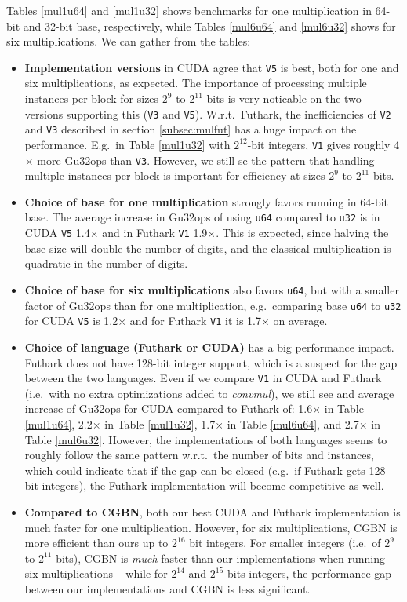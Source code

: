 Tables \ref{mul1u64} and \ref{mul1u32} shows benchmarks for one multiplication
in 64-bit and 32-bit base, respectively, while Tables \ref{mul6u64} and
\ref{mul6u32} shows for six multiplications. We can gather from the tables:
\begin{itemize}
  \renewcommand\labelitemi{--}
\item \textbf{Implementation versions} in CUDA agree that \texttt{V5} is best,
  both for one and six multiplications, as expected. The importance of
  processing multiple instances per block for sizes $2^9$ to $2^{11}$ bits is
  very noticable on the two versions supporting this (\texttt{V3} and
  \texttt{V5}). W.r.t.\ Futhark, the inefficiencies of \texttt{V2} and
  \texttt{V3} described in section \ref{subsec:mulfut} has a huge impact on the
  performance. E.g.\ in Table \ref{mul1u32} with $2^{12}$-bit integers,
  \texttt{V1} gives roughly 4$\times$ more Gu32ops than \texttt{V3}. However, we
  still se the pattern that handling multiple instances per block is important
  for efficiency at sizes $2^9$ to $2^{11}$ bits.
\item \textbf{Choice of base for one multiplication} strongly favors running in
  64-bit base. The average increase in Gu32ops of using \texttt{u64} compared to
  \texttt{u32} is in CUDA \texttt{V5} 1.4$\times$ and in Futhark \texttt{V1}
  1.9$\times$. This is expected, since halving the base size will double the number
  of digits, and the classical multiplication is quadratic in the number of
  digits.
\item \textbf{Choice of base for six multiplications} also favors \texttt{u64},
  but with a smaller factor of Gu32ops than for one multiplication, e.g.\
  comparing base \texttt{u64} to \texttt{u32} for CUDA \texttt{V5} is
  1.2$\times$ and for Futhark \texttt{V1} it is 1.7$\times$ on average.
\item \textbf{Choice of language (Futhark or CUDA)} has a big performance
  impact. Futhark does not have 128-bit integer support, which is a suspect for
  the gap between the two languages. Even if we compare \texttt{V1} in CUDA and
  Futhark (i.e.\ with no extra optimizations added to \textit{convmul}), we
  still see and average increase of Gu32ops for CUDA compared to Futhark of:
  1.6$\times$ in Table \ref{mul1u64}, 2.2$\times$ in Table \ref{mul1u32},
  1.7$\times$ in Table \ref{mul6u64}, and 2.7$\times$ in Table \ref{mul6u32}. However, the
  implementations of both languages seems to roughly follow the same pattern
  w.r.t.\ the number of bits and instances, which could indicate that if the gap
  can be closed (e.g.\ if Futhark gets 128-bit integers), the Futhark
  implementation will become competitive as well.
\item \textbf{Compared to CGBN}, both our best CUDA and Futhark implementation
  is much faster for one multiplication. However, for six multiplications, CGBN
  is more efficient than ours up to $2^{16}$ bit integers. For smaller integers
  (i.e.\ of $2^9$ to $2^{11}$ bits), CGBN is \textit{much} faster than our
  implementations when running six multiplications -- while for $2^{14}$ and
  $2^{15}$ bits integers, the performance gap between our implementations and
  CGBN is less significant.
\end{itemize}

